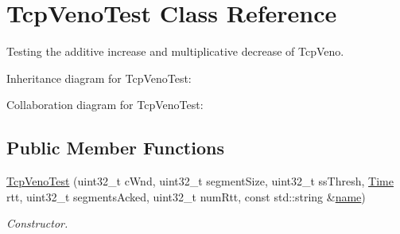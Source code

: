 \hypertarget{classTcpVenoTest}{}\section{Tcp\+Veno\+Test Class Reference}
\label{classTcpVenoTest}


Testing the additive increase and multiplicative decrease of Tcp\+Veno.  




Inheritance diagram for Tcp\+Veno\+Test\+:


Collaboration diagram for Tcp\+Veno\+Test\+:
\subsection*{Public Member Functions}
\begin{DoxyCompactItemize}
\item 
\hyperlink{classTcpVenoTest_ab652bb28734808382f1d0e26e5aec819}{Tcp\+Veno\+Test} (uint32\+\_\+t c\+Wnd, uint32\+\_\+t segment\+Size, uint32\+\_\+t ss\+Thresh, \hyperlink{classns3_1_1Time}{Time} rtt, uint32\+\_\+t segments\+Acked, uint32\+\_\+t num\+Rtt, const std\+::string \&\hyperlink{generate__test__data__lte__spectrum__model_8m_ab74e6bf80237ddc4109968cedc58c151}{name})
\begin{DoxyCompactList}\small\item\em Constructor. \end{DoxyCompactList}\end{DoxyCompactItemize}
